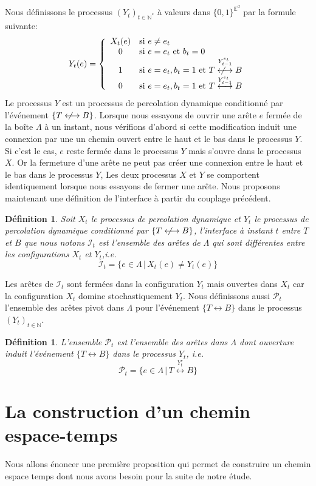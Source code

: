 \documentclass[titlepage,a4paper,12pt]{article}
\newcounter{def}
\newcounter{th}
\newcounter{propo}
\newtheorem{defi}[def]{Définition}
\newcommand{\nlongleftrightarrow}{\longleftrightarrow \kern-15pt\not \kern15pt}
\begin{document}
Nous définissons le processus $(Y_t)_{t\in\mathbb{N}^*}$ à valeurs dans $\{0,1\}^{\mathbb{E}^d}$ par la formule suivante:
$$ Y_t(e) = \left\lbrace \begin{array}{cl}
X_t(e) & \text{si }e \neq e_t\\
0 &\text{si } e = e_t\text{ et } b_t = 0\\
1 & \text{si } e=e_t, b_t = 1 \text{ et } T\overset{Y_{t-1}^{e_t}}{\nlongleftrightarrow} B\\
0 & \text{si } e=e_t, b_t = 1 \text{ et } T\overset{Y_{t-1}^{e_t}}{\longleftrightarrow} B
\end{array} \right.
$$
Le processus $Y$ est un processus de percolation dynamique conditionné par l'événement $\{T\nlongleftrightarrow B\}$. Lorsque nous essayons de ouvrir une arête $e$ fermée de la boîte $\Lambda$ à un instant, nous vérifions d'abord si cette modification induit une connexion par une un chemin ouvert entre le haut et le bas dans le processus $Y$. Si c'est le cas, $e$ reste fermée dans le processus $Y$ mais s'ouvre dans le processus $X$. Or la fermeture d'une arête ne peut pas créer une connexion entre le haut et le bas dans le processus $Y$, Les deux processus $X$ et $Y$ se comportent identiquement lorsque nous essayons de fermer une arête.
Nous proposons maintenant une définition de l'interface à partir du couplage précédent.
\begin{defi} Soit $X_t$ le processus de percolation dynamique et $Y_t$ le processus de percolation dynamique conditionné par $\{T\nlongleftrightarrow B\}$, l'interface à instant $t$ entre $T$ et $B$ que nous notons $\mathcal{I}_t$ est l'ensemble des arêtes de $\Lambda$ qui sont différentes entre les configurations $X_t$ et $Y_t$,i.e.
$$ \mathcal{I}_t = \big\{e\in\Lambda \,|\, X_t(e) \neq Y_t(e)\big\}
$$
\end{defi}
Les arêtes de $\mathcal{I}_t$ sont fermées dans la configuration $Y_t$ mais ouvertes dans $X_t$ car la configuration $X_t$ domine stochastiquement $Y_t$.
Nous définissons aussi $\mathcal{P}_t$ l'ensemble des arêtes pivot dans $\Lambda$ pour l'événement $\{T\longleftrightarrow B\}$ dans le processus $(Y_t)_{t\in \mathbb{N}}$. 
\begin{defi} L'ensemble $\mathcal{P}_t$ est l'ensemble des arêtes dans $\Lambda$ dont ouverture induit l'événement $\{T\longleftrightarrow B\}$ dans le processus $Y_t$, i.e.
$$\mathcal{P}_t = \big\{ e\in\Lambda \,|\, T\overset{Y_t^e}{\longleftrightarrow} B\big\}
$$
\end{defi}
\section{La construction d'un chemin espace-temps}
Nous allons énoncer une première proposition qui permet de construire un chemin espace temps dont nous avons besoin pour la suite de notre étude.
\end{document}
